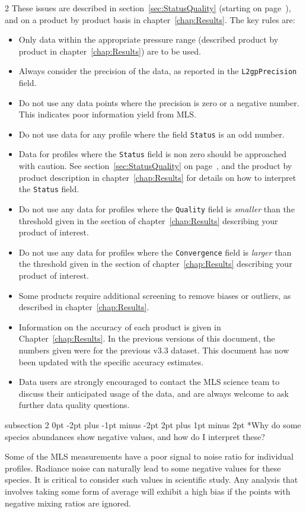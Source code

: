 \documentclass[11pt,draft]{report}
\makeatletter
\renewcommand{\subsection}{\@startsection%
  {subsection}%
  {2}%
  {0pt}%
  {-2pt plus -1pt minus -2pt}%
  {2pt plus 1pt minus 2pt}%
  {\large\sffamily\fontseries{sb}\selectfont\flushleft\color{SectionColor}\figureversion{tabular}}}%
\makeatother
\begin{document}
\begin{multicols}{2}
These issues are described in section~\ref{sec:StatusQuality} (starting
on page~\pageref{sec:StatusQuality}), and on a product by product basis
in chapter~\ref{chap:Results}.  The key rules are:
\begin{itemize}[leftmargin=2ex]
\item Only data within the appropriate pressure range (described product
  by product in chapter~\ref{chap:Results}) are to be used.
\item Always consider the precision of the data, as reported in the
  \texttt{L2gpPrecision} field.
\item Do not use any data points where the precision is zero or a
  negative number.  This indicates poor information yield from MLS.
\item Do not use data for any profile where the field \texttt{Status} is
  an odd number.
\item Data for profiles where the \texttt{Status} field is non zero
  should be approached with caution.  See
  section~\ref{sec:StatusQuality} on page~\pageref{sec:StatusQuality},
  and the product by product description in chapter~\ref{chap:Results}
  for details on how to interpret the \texttt{Status} field.
\item Do not use any data for profiles where the \texttt{Quality} field
  is \emph{smaller} than the threshold given in the section of
  chapter~\ref{chap:Results} describing your product of interest.
\item Do not use any data for profiles where the \texttt{Convergence}
  field is \emph{larger} than the threshold given in the section of
  chapter~\ref{chap:Results} describing your product of interest.
\item Some products require additional screening to remove biases or
  outliers, as described in chapter~\ref{chap:Results}.
\item Information on the accuracy of each product is given in
  Chapter~\ref{chap:Results}.  In the previous versions of this
  document, the numbers given were for the previous v3.3 dataset.  This
  document has now been updated with the specific \thisv accuracy
  estimates.
\item Data users are strongly encouraged to contact the MLS
  science team to discuss their anticipated usage of the data, and are
  always welcome to ask further data quality questions.
\end{itemize}

\subsection*{Why do some species abundances show negative values, and how do I
  interpret these?}

Some of the MLS measurements have a poor signal to noise ratio for
individual profiles.  Radiance noise can naturally lead to some negative
values for these species.  It is critical to consider such values in
scientific study.  Any analysis that involves taking some form of
average will exhibit a high bias if the points with negative mixing
ratios are ignored.

\end{multicols}
\end{document}
